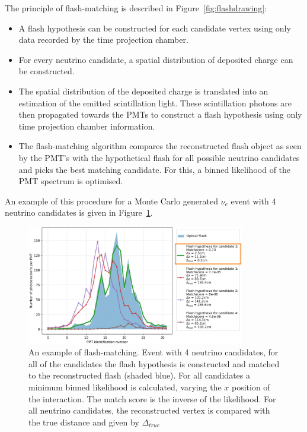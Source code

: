 \documentclass[a4paper]{article}
\begin{document}
The principle of flash-matching is described in Figure~\ref{fig:flashdrawing}:
\begin{itemize}
\item A flash hypothesis can be constructed for each candidate vertex using only data recorded by the time projection chamber.
\item For every neutrino candidate, a spatial distribution of deposited charge can be constructed.
\item The spatial distribution of the deposited charge is translated into an estimation of the emitted scintillation light. These scintillation photons are then propagated towards the PMTs to construct a flash hypothesis using only time projection chamber information.
\item The flash-matching algorithm compares the reconstructed flash object as seen by the PMT's with the hypothetical flash for all possible neutrino candidates and picks the best matching candidate. For this, a binned likelihood of the PMT spectrum is optimised.
\end{itemize}
An example of this procedure for a Monte Carlo generated $\nu_e$ event with 4 neutrino candidates is given in Figure~\ref{fig:flashmatch}.
\begin{figure}[!htbp]
\centering
\includegraphics[width=0.85\textwidth]{flashmatch} 
\caption{An example of flash-matching. Event with 4 neutrino candidates, for all of the candidates the flash hypothesis is constructed and matched to the reconstructed flash (shaded blue). For all candidates a minimum binned likelihood is calculated, varying the $x$ position of the interaction. The match score is the inverse of the likelihood. For all neutrino candidates, the reconstructed vertex is compared with the true distance and given by $\Delta_{true}$ } 
\label{fig:flashmatch}
\end{figure}
\end{document}
